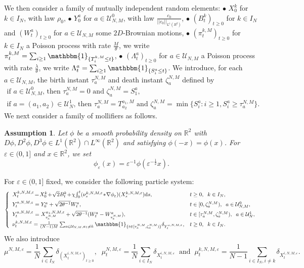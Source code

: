 \documentclass[11pt]{article}
\newtheorem{assumption}[theorem]{Assumption}
\newcommand{\R}{\mathbb{R}}
\newcommand{\1}{\mathbbm{1}}
\newcommand{\dd}{{\rm d}}
\newcommand{\Uu}{\mathcal U}
\newcommand{\e}{\varepsilon}
\newcommand{\vip}{\vskip5pt}
\begin{document}
We then consider a family of mutually independent random elements:
\vip
\noindent $\bullet$ $X^{k}_0$ for $k \in I_N$, with law $\rho_0$,
\vip
\noindent $\bullet$ $Y^a_0$ for $a \in \Uu^0_{N,M}$, with law $\frac{c_0}{||c_0||_{L^1(R^2)}}$,
\vip
\noindent $\bullet$ $(B^k_t)_{t\geq 0}$ for $k\in I_N$ and $(W^a_t)_{t\geq 0}$ for $a \in \Uu_{N,M}$ some 
$2D$-Brownian motions,
\vip
\noindent $\bullet$ $(\pi^{k,M}_t)_{t\geq 0}$ for $k\in I_N$ 
a Poisson process with rate $\frac M \theta$, we write $\pi^{k,M}_t=\sum_{i\geq 1}\1_{\{T^{k,M}_i\leq t\}}$,
\vip
\noindent $\bullet$ $(\Lambda^a_t)_{t\geq 0}$ for $a \in \Uu_{N,M}$ 
a Poisson process with rate $\frac \lambda \theta$, we write $\Lambda^a_t=\sum_{i\geq 1}\1_{\{S^{a}_i\leq t\}}$.
\vip
We introduce, for each $a\in \Uu_{N,M}$, the birth instant $\tau_a^{N,M}$ and death instant $\zeta_a^{N,M}$
defined by
\begin{gather*}
\text{if $a \in \Uu^0_{N,M}$, then $\tau_a^{N,M}=0$ and  $\zeta_a^{N,M}=S^a_1$,}\\
\text{if $a=(a_1,a_2) \in \Uu^1_{N}$, then $\tau_a^{N,M}=T^{a_1,M}_{a_2}$ and  
$\zeta_a^{N,M}=\min\{S^a_i : i\geq 1, S^a_i\geq \tau_a^{N,M}\}$.}
\end{gather*}
We next consider a family of mollifiers as follows.
\begin{assumption}\label{mol}
Let $\phi$ be a smooth probability density on $\R^2$ with $D\phi, D^2\phi, D^3\phi \in L^1(\R^2)\cap L^\infty(\R^2)$ and satisfying $\phi(-x)=\phi(x)$. For $\e \in (0,1]$ and $x \in \R^2$, we set
\begin{equation*}
\phi_\e(x)=\e^{-1}\phi(\e^{-\frac12}x).
\end{equation*}
\end{assumption}
For $\e\in (0,1]$ fixed, we consider the following particle system:
\begin{equation}\label{troc}
\left\{\begin{array}{lll}
X^{k,N,M,\e}_t\!=\! X^k_0 \!+\! \sqrt 2 B^k_t \! 
+ \! \chi \!\int_0^t (\nu^{k,N,M,\e}_s \!\ast\! \nabla \phi_{\e})(X^{k,N,M,\e}_s)\dd s,
&t\geq 0, \;\; k\in I_N,\\[5pt]
Y^{a,N,M,\e}_t=Y^{a}_0+\sqrt{2\theta^{-1}} W^a_t, & t\in [0,\zeta_a^{N,M}), \;\; a \in \Uu^0_{N,M},\\[5pt]
Y^{a,N,M,\e}_t=X^{a_1,N,M,\e}_{\tau_a^{N,M}}+\sqrt{2\theta^{-1}} (W^a_t-W^a_{\tau_a^{N,M}}), & t\in [\tau_a^{N,M},\zeta_a^{N,M}), 
\;\; a \in \Uu^1_{N},\\[5pt]
\nu^{k,N,M,\e}_t= \frac1{(N-1)M}\sum_{a \in \Uu_{N,M},a_1\neq k} \1_{\{t\in [\tau_a^{N,M},\zeta_a^{N,M})\}}\delta_{Y^{a,N,M,\e}_t}, 
& t\geq 0, \;\; k\in I_N.
\end{array}\right.
\end{equation}
We also introduce
\begin{equation*}
\mu^{N,M,\e}=\frac 1 N \sum_{i \in I_N} \delta_{(X^{i,N,M,\e}_t)_{t\geq 0}}, \;\;
\mu^{N,M,\e}_t=\frac 1 N \sum_{i\in I_N} \delta_{X^{i,N,M,\e}_t} \;\; \text{and} \;\;
\mu^{k,N,M,\e}_t=\frac 1 {N-1} \sum_{i\in I_N,i\neq k} \delta_{X^{i,N,M,\e}_t}.
\end{equation*}
\end{document}
